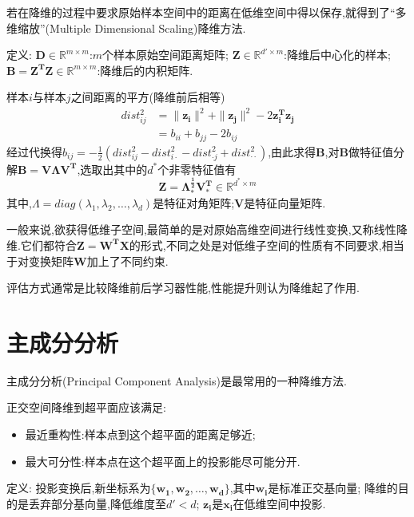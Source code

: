 若在降维的过程中要求原始样本空间中的距离在低维空间中得以保存,就得到了``多维缩放''(Multiple Dimensional Scaling)降维方法.

定义:  
$\mathbf{D}\in\mathbb{R}^{m\times m}$:$m$个样本原始空间距离矩阵;  
$\mathbf{Z}\in\mathbb{R}^{d'\times m}$:降维后中心化的样本;  
$\mathbf{B}=\mathbf{Z^TZ}\in\mathbb{R}^{m\times m}$:降维后的内积矩阵.

样本$i$与样本$j$之间距离的平方(降维前后相等)
\begin{equation}\begin{split}
dist_{ij}^2&=\|\mathbf{z_i}\|^2+\|\mathbf{z_j}\|^2-2\mathbf{z_i^Tz_j}\\
&=b_{ii}+b_{jj}-2b_{ij}
\end{split}\end{equation}
经过代换得$b_{ij}=-\frac{1}{2}(dist_{ij}^2-dist_{i\cdot}^2-dist_{\cdot j}^2+dist_{\cdot\cdot}^2)$,由此求得$\mathbf{B}$,对$\mathbf{B}$做特征值分解$\mathbf{B=V\Lambda V^T}$,选取出其中的$d^\ast$个非零特征值有
\begin{equation}
\mathbf{Z=\Lambda_{\ast}^{\frac{1}{2}}V_{\ast}^T}\in\mathbb{R}^{d^\ast\times m}
\end{equation}
其中,$\Lambda=diag(\lambda_1, \lambda_2, \dots, \lambda_d)$是特征对角矩阵;$\mathbf{V}$是特征向量矩阵.

一般来说,欲获得低维子空间,最简单的是对原始高维空间进行线性变换,又称线性降维.它们都符合$\mathbf{Z=W^TX}$的形式,不同之处是对低维子空间的性质有不同要求,相当于对变换矩阵$\mathbf{W}$加上了不同约束.

评估方式通常是比较降维前后学习器性能,性能提升则认为降维起了作用.

\section{主成分分析}

主成分分析(Principal Component Analysis)是最常用的一种降维方法.

正交空间降维到超平面应该满足:
\begin{itemize}
\item 最近重构性:样本点到这个超平面的距离足够近;
\item 最大可分性:样本点在这个超平面上的投影能尽可能分开.
\end{itemize}

定义:  
投影变换后,新坐标系为$\{\mathbf{w_1, w_2, \dots, w_d}\}$,其中$\mathbf{w_i}$是标准正交基向量;  
降维的目的是丢弃部分基向量,降低维度至$d'< d$;  
$\mathbf{z_i}$是$\mathbf{x_i}$在低维空间中投影.

